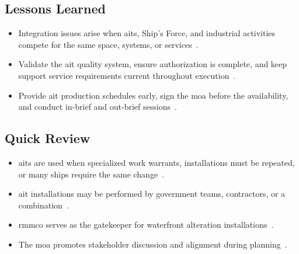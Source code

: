 \documentclass[../main.tex]{subfiles}
\begin{document}
\subsection{Lessons Learned}
\begin{itemize}
  \item Integration issues arise when \acp{ait}, Ship's Force, and industrial activities compete for the same space, systems, or services~\autocite{edo-4-1-4-ait-fundamentals-2025}.
  \item Validate the \ac{ait} quality system, ensure authorization is complete, and keep support service requirements current throughout execution~\autocite{edo-4-1-4-ait-fundamentals-2025}.
  \item Provide \ac{ait} production schedules early, sign the \ac{moa} before the availability, and conduct in-brief and out-brief sessions~\autocite{edo-4-1-4-ait-fundamentals-2025}.
\end{itemize}

\subsection{Quick Review}
\begin{itemize}
  \item \acp{ait} are used when specialized work warrants, installations must be repeated, or many ships require the same change~\autocite{edo-4-1-4-ait-fundamentals-2025}.
  \item \ac{ait} installations may be performed by government teams, contractors, or a combination~\autocite{edo-4-1-4-ait-fundamentals-2025}.
  \item \ac{rmmco} serves as the gatekeeper for waterfront alteration installations~\autocite{edo-4-1-4-ait-fundamentals-2025}.
  \item The \ac{moa} promotes stakeholder discussion and alignment during planning~\autocite{edo-4-1-4-ait-fundamentals-2025}.
\end{itemize}

\end{document}
